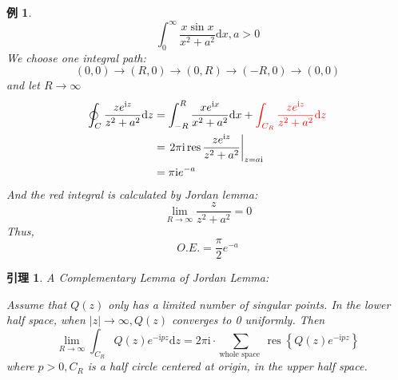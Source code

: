 \documentclass[10pt, a4paper, oneside]{ctexbook}
\newtheorem{lemma}[theorem]{引理}
\newtheorem{example}[theorem]{例}
\def\D{\mathrm{d}}
\begin{document}
\begin{example}
     $$\int_{0}^{\infty} \frac{x \sin x}{x^{2}+a^{2}} \D x, a>0 $$
    \rm We choose one integral path:
    $$(0,0)\to(R,0)\to(0,R)\to(-R,0)\to(0,0)$$ and let $R\to \infty$
    \begin{align*}
        \begin{aligned}
            \oint_{C} \frac{z e^{\mathrm{i} z}}{z^{2}+a^{2}} \D z & =\int_{-R}^{R} \frac{x e^{\mathrm{i} x}}{x^{2}+a^{2}} \D x+{\color{red} \int_{C_{R}} \frac{z e^{\mathrm{i} z}}{z^{2}+a^{2}} \D z } \\
                                                                  & =\left.2 \pi \mathrm{i} \operatorname{res} \frac{z e^{\mathrm{i} z}}{z^{2}+a^{2}}\right|_{z=a \mathrm{i}}                          \\
                                                                  & =\pi \mathrm{i} e^{-a}
        \end{aligned}
    \end{align*}
    And the {\color{red}red integral} is calculated by Jordan lemma:
    $$\lim_{R\to \infty} \frac{z}{z^2+a^2} = 0$$
    Thus, $$O.E.=\frac{\pi}{2}e^{-a}$$
\end{example}
\begin{lemma}
    A Complementary Lemma of Jordan Lemma:\rm

    Assume that $Q(z)$ only has a limited number of singular points. In the lower half space, when $|z| \rightarrow \infty, Q(z)$ converges to 0 uniformly. Then
    $$\lim _{R \rightarrow \infty} \int_{C_{R}} Q(z) e^{-\mathrm{i} p z} \D z=2 \pi \mathrm{i} \cdot \sum_{\text {whole space }} \operatorname{res}\left\{Q(z) e^{-\mathrm{i} p z}\right\}$$
    where $p>0, C_{R}$ is a half circle centered at origin, in the upper half space.
\end{lemma}
\end{document}
